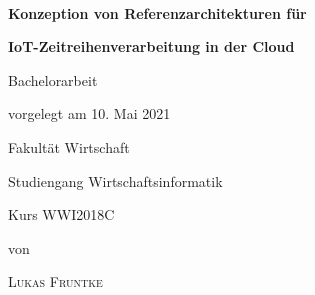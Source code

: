 \newcommand{\typMeinerArbeit}{Bachelorarbeit} 

\newcommand{\themaMeinerArbeit}{Konzeption von Referenzarchitekturen für IoT-Zeitreihenverarbeitung in der Cloud}

\newcommand{\meinName}{Lukas Fruntke}

\thispagestyle{empty}

\begin{spacing}{1}
\begin{center}	
~\vspace{0mm}

{\sffamily
\Large  
\textbf{Konzeption von Referenzarchitekturen für}

\bigskip
\textbf{IoT-Zeitreihenverarbeitung in der Cloud}
}


\vspace{15mm}

{\Large \typMeinerArbeit}

\vspace{1cm}

vorgelegt am 10. Mai 2021

\vspace{15mm}

Fakultät Wirtschaft
\medskip

Studiengang Wirtschaftsinformatik
\medskip

Kurs WWI2018C 

\vspace{10mm}

von

\vspace{10mm}

{\large\textsc{\meinName}}

\vspace{10mm}
\end{center}

\vfill


\end{spacing}
